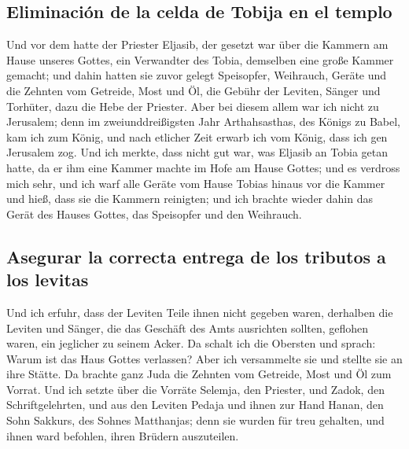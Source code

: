 \hypertarget{eliminaciuxf3n-de-la-celda-de-tobija-en-el-templo}{%
\subsection{Eliminación de la celda de Tobija en el
templo}\label{eliminaciuxf3n-de-la-celda-de-tobija-en-el-templo}}

 Und vor dem hatte der Priester Eljasib, der gesetzt war
über die Kammern am Hause unseres Gottes, ein Verwandter des Tobia,
demselben eine große Kammer gemacht;  und dahin hatten sie
zuvor gelegt Speisopfer, Weihrauch, Geräte und die Zehnten vom Getreide,
Most und Öl, die Gebühr der Leviten, Sänger und Torhüter, dazu die Hebe
der Priester.  Aber bei diesem allem war ich nicht zu
Jerusalem; denn im zweiunddreißigsten Jahr Arthahsasthas, des Königs zu
Babel, kam ich zum König, und nach etlicher Zeit erwarb ich vom König,
 dass ich gen Jerusalem zog. Und ich merkte, dass nicht
gut war, was Eljasib an Tobia getan hatte, da er ihm eine Kammer machte
im Hofe am Hause Gottes;  und es verdross mich sehr, und
ich warf alle Geräte vom Hause Tobias hinaus vor die Kammer
 und hieß, dass sie die Kammern reinigten; und ich brachte
wieder dahin das Gerät des Hauses Gottes, das Speisopfer und den
Weihrauch.

\hypertarget{asegurar-la-correcta-entrega-de-los-tributos-a-los-levitas}{%
\subsection{Asegurar la correcta entrega de los tributos a los
levitas}\label{asegurar-la-correcta-entrega-de-los-tributos-a-los-levitas}}

 Und ich erfuhr, dass der Leviten Teile ihnen nicht
gegeben waren, derhalben die Leviten und Sänger, die das Geschäft des
Amts ausrichten sollten, geflohen waren, ein jeglicher zu seinem Acker.
 Da schalt ich die Obersten und sprach: Warum ist das
Haus Gottes verlassen? Aber ich versammelte sie und stellte sie an ihre
Stätte.  Da brachte ganz Juda die Zehnten vom Getreide,
Most und Öl zum Vorrat.  Und ich setzte über die Vorräte
Selemja, den Priester, und Zadok, den Schriftgelehrten, und aus den
Leviten Pedaja und ihnen zur Hand Hanan, den Sohn Sakkurs, des Sohnes
Matthanjas; denn sie wurden für treu gehalten, und ihnen ward befohlen,
ihren Brüdern auszuteilen.

